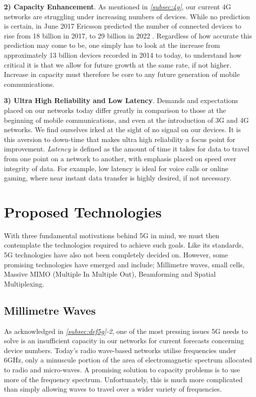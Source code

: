 \documentclass[journal]{IEEEtran}
\begin{document}
\textbf{2) Capacity Enhancement}. As mentioned in \textit{\ref{subsec:4g}}, our current 4G networks are struggling under increasing numbers of devices. While no prediction is certain, in June 2017 Ericsson predicted the number of connected devices to rise from 18 billion in 2017, to 29 billion in 2022 \cite{ericssondev}. Regardless of how accurate this prediction may come to be, one simply has to look at the increase from approximately 13 billion devices recorded in 2014 \cite{ericssondev} to today, to understand how critical it is that we allow for future growth at the same rate, if not higher. Increase in capacity must therefore be core to any future generation of mobile communications.

\textbf{3) Ultra High Reliability and Low Latency}. Demands and expectations placed on our networks today differ greatly in comparison to those at the beginning of mobile communications, and even at the introduction of 3G and 4G networks. We find ourselves irked at the sight of no signal on our devices. It is this aversion to down-time that makes ultra high reliability a focus point for improvement. \textit{Latency} is defined as the amount of time it takes for data to travel from one point on a network to another, with emphasis placed on speed over integrity of data. For example, low latency is ideal for voice calls or online gaming, where near instant data transfer is highly desired, if not necessary.

\section{Proposed Technologies}

With three fundamental motivations behind 5G in mind, we must then contemplate the technologies required to achieve such goals. Like its standards, 5G technologies have also not been completely decided on. However, some promising technologies have emerged and include; Millimetre waves, small cells, Massive MIMO (Multiple In Multiple Out), Beamforming and Spatial Multiplexing.

\subsection{Millimetre Waves}
As acknowledged in \textit{\ref{subsec:def5g}-2}, one of the most pressing issues 5G needs to solve is an insufficient capacity in our networks for current forecasts concerning device numbers. Today's radio wave-based networks utilise frequencies under 6GHz, only a minuscule portion of the area of electromagnetic spectrum allocated to radio and micro-waves. A promising solution to capacity problems is to use more of the frequency spectrum. Unfortunately, this is much more complicated than simply allowing waves to travel over a wider variety of frequencies. 
\end{document}
